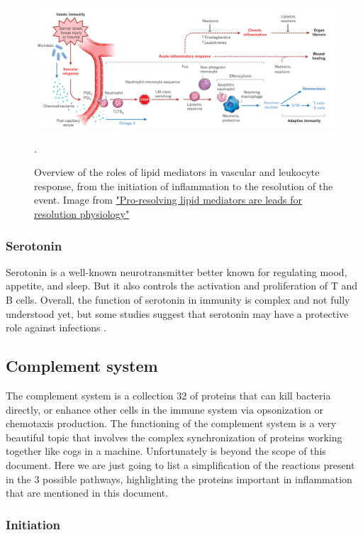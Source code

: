    \begin{figure}[ht]
        \centering
            \includegraphics[width=0.9\linewidth]{figures/Inflammation/nature1.png} 
        \caption{Overview of the roles of lipid mediators in vascular and leukocyte response, from the initiation of inflammation to the resolution of the event. Image from \href{https://www.nature.com/articles/nature13479}{"Pro-resolving lipid mediators are leads for resolution physiology"}}.
        \label{figure:Eicosanoids1}
    \end{figure}  

\subsubsection{Serotonin}

Serotonin is a well-known neurotransmitter better known for regulating mood, appetite, and sleep. But it also controls the activation and proliferation of T and B cells. Overall, the function of serotonin in immunity is complex and not fully understood yet, but some studies suggest that serotonin may have a protective role against infections \cite{Roumier2019}.

\subsection{Complement system}

The complement system is a collection 32 of proteins that can kill bacteria directly, or enhance other cells in the immune system via opsonization or chemotaxis production. The functioning of the complement system is a very beautiful topic that involves the complex synchronization of proteins working together like cogs in a machine. Unfortunately is beyond the scope of this document. Here we are just going to list a simplification of the reactions present in the 3 possible pathways, highlighting the proteins important in inflammation that are mentioned in this document.

\subsubsection{Initiation}

